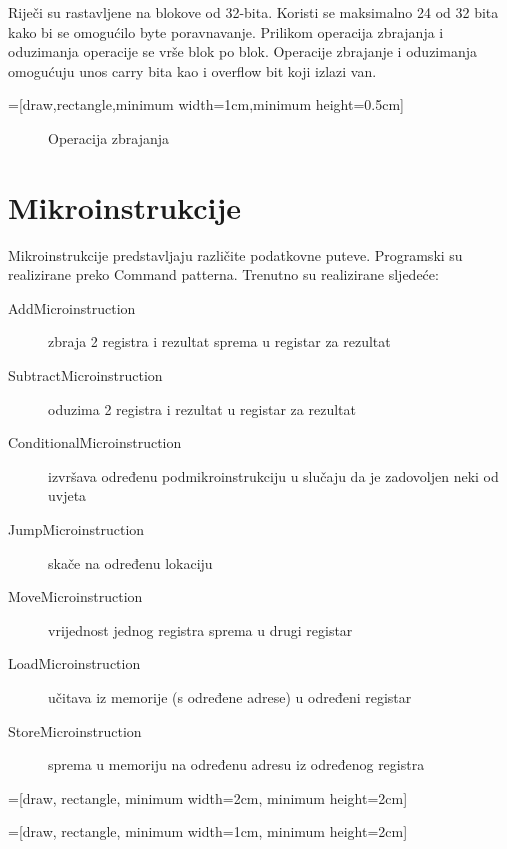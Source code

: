 \documentclass[a4paper]{article}
\begin{document}
  Riječi su rastavljene na blokove od 32-bita. Koristi se maksimalno
  24 od 32 bita kako bi se omogućilo byte poravnavanje. Prilikom
  operacija zbrajanja i oduzimanja operacije se vrše blok po blok.
  Operacije zbrajanje i oduzimanja omogućuju unos carry bita kao
  i overflow bit koji izlazi van.

  =[draw,rectangle,minimum width=1cm,minimum height=0.5cm]

  \begin{figure}

    \caption{Operacija zbrajanja}
  \end{figure}

  \section{Mikroinstrukcije}
  Mikroinstrukcije predstavljaju različite podatkovne puteve.
  Programski su realizirane preko Command patterna.  Trenutno su
  realizirane sljedeće:
  \begin{description}
    \item[AddMicroinstruction] zbraja 2 registra i rezultat sprema u
      registar za rezultat
    \item[SubtractMicroinstruction] oduzima 2 registra i rezultat u
      registar za rezultat
    \item[ConditionalMicroinstruction] izvršava određenu
      podmikroinstrukciju u slučaju da je zadovoljen neki od uvjeta
    \item[JumpMicroinstruction] skače na određenu lokaciju
    \item[MoveMicroinstruction] vrijednost jednog registra sprema u
      drugi registar
    \item[LoadMicroinstruction] učitava iz memorije (s određene
      adrese) u određeni registar
    \item[StoreMicroinstruction] sprema u memoriju na određenu adresu
      iz određenog registra
  \end{description}


  =[draw, rectangle, minimum width=2cm,
    minimum height=2cm]

  =[draw, rectangle, minimum width=1cm,
    minimum height=2cm]
\end{document}
